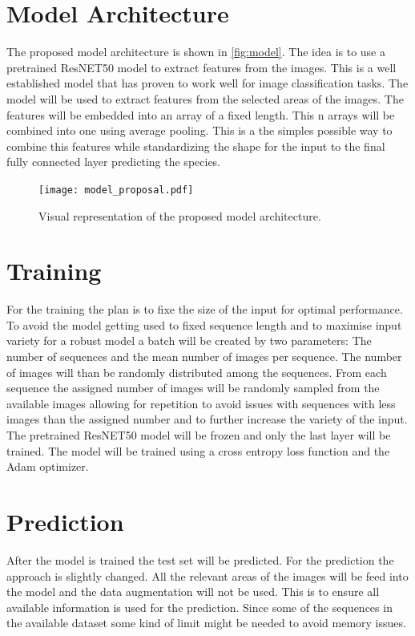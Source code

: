 \documentclass{article}
\begin{document}
\section*{Model Architecture}

The proposed model architecture is shown in \autoref{fig:model}. The idea is to use a pretrained ResNET50 model to extract features from the images.
This is a well established model that has proven to work well for image classification tasks. The model will be used to extract features from the
selected areas of the images. The features will be embedded into an array of a fixed length. This n arrays will be combined into one using average pooling.
This is a the simples possible way to combine this features while standardizing the shape for the input to the final fully connected layer
predicting the species.

\begin{figure}[h]
  \centering
  \texttt{[image: model\_proposal.pdf]}
  \caption{Visual representation of the proposed model architecture.}
  \label{fig:model}
\end{figure}

\section*{Training}

For the training the plan is to fixe the size of the input for optimal performance. To avoid the model getting used to fixed sequence length and to
maximise input variety for a robust model a batch will be created by two parameters: The number of sequences and the mean number of images per sequence.
The number of images will than be randomly distributed among the sequences. From each sequence the assigned number of images will be randomly sampled
from the available images allowing for repetition to avoid issues with sequences with less images than the assigned number and to further increase
the variety of the input. The pretrained ResNET50 model will be frozen and only the last layer will be trained.
The model will be trained using a cross entropy loss function and the Adam optimizer.

\section*{Prediction}

After the model is trained the test set will be predicted. For the prediction the approach is slightly changed. All the relevant areas of the images will be feed into the model
and the data augmentation will not be used. This is to ensure all available information is used for the prediction. Since some of the sequences in the available dataset some
kind of limit might be needed to avoid memory issues.
\end{document}
